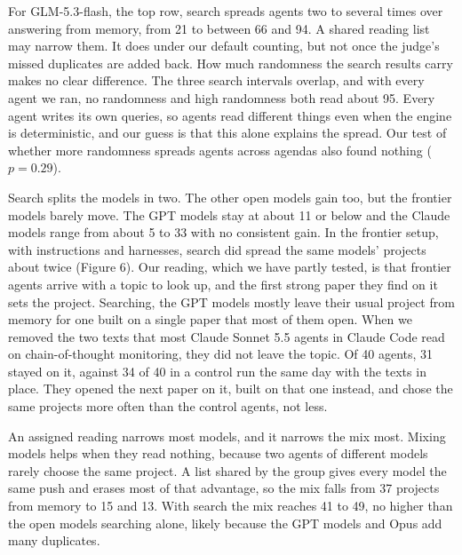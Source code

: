 \documentclass[11pt]{article}
\begin{document}
For GLM-5.3-flash, the top row, search spreads agents two to several
times over answering from memory, from 21 to between 66 and 94. A shared
reading list may narrow them. It does under our default counting, but
not once the judge's missed duplicates are added back. How much
randomness the search results carry makes no clear difference. The three
search intervals overlap, and with every agent we ran, no randomness and
high randomness both read about 95. Every agent writes its own queries,
so agents read different things even when the engine is deterministic,
and our guess is that this alone explains the spread. Our test of
whether more randomness spreads agents across agendas also found nothing
(\(p = 0.29\)).

Search splits the models in two. The other open models gain too, but the
frontier models barely move. The GPT models stay at about 11 or below
and the Claude models range from about 5 to 33 with no consistent gain.
In the frontier setup, with instructions and harnesses, search did
spread the same models' projects about twice (Figure 6). Our reading,
which we have partly tested, is that frontier agents arrive with a topic
to look up, and the first strong paper they find on it sets the project.
Searching, the GPT models mostly leave their usual project from memory
for one built on a single paper that most of them open. When we removed
the two texts that most Claude Sonnet 5.5 agents in Claude Code read on
chain-of-thought monitoring, they did not leave the topic. Of 40 agents,
31 stayed on it, against 34 of 40 in a control run the same day with the
texts in place. They opened the next paper on it, built on that one
instead, and chose the same projects more often than the control agents,
not less.

An assigned reading narrows most models, and it narrows the mix most.
Mixing models helps when they read nothing, because two agents of
different models rarely choose the same project. A list shared by the
group gives every model the same push and erases most of that advantage,
so the mix falls from 37 projects from memory to 15 and 13. With search
the mix reaches 41 to 49, no higher than the open models searching
alone, likely because the GPT models and Opus add many duplicates.
\end{document}
